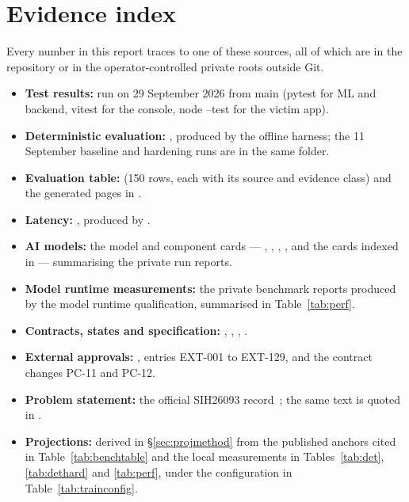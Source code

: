 \documentclass[11pt,a4paper]{article}
\newcommand{\codeus}{\textunderscore\allowbreak}
\DeclareRobustCommand{\code}[1]{{\ttfamily\let\_\codeus #1}}
\begin{document}
\section{Evidence index}
Every number in this report traces to one of these sources, all of which are in the repository or in
the operator-controlled private roots outside Git.

\begin{itemize}
  \item \textbf{Test results:} run on 29 September 2026 from \code{main} (\code{pytest} for ML and
        backend, \code{vitest} for the console, \code{node --test} for the victim app).
  \item \textbf{Deterministic evaluation:} , produced by
        the offline harness; the 11 September baseline and hardening runs are in the same folder.
  \item \textbf{Evaluation table:}  (150 rows, each
        with its source and evidence class) and the generated pages in .
  \item \textbf{Latency:} , produced by
        .
  \item \textbf{AI models:} the model and component cards --- ,
        , ,
        ,  and the cards
        indexed in  --- summarising the private run reports.
  \item \textbf{Model runtime measurements:} the private benchmark reports produced by the model
        runtime qualification, summarised in Table~\ref{tab:perf}.
  \item \textbf{Contracts, states and specification:} ,
        , ,
        .
  \item \textbf{External approvals:} , entries EXT-001 to
        EXT-129, and the contract changes PC-11 and PC-12.
  \item \textbf{Problem statement:} the official SIH26093 record~\cite{sih26093}; the same text is
        quoted in .
  \item \textbf{Projections:} derived in \S\ref{sec:projmethod} from the published anchors cited in
        Table~\ref{tab:benchtable} and the local measurements in Tables~\ref{tab:det},
        \ref{tab:dethard} and \ref{tab:perf}, under the configuration in
        Table~\ref{tab:trainconfig}.
\end{itemize}
\end{document}
